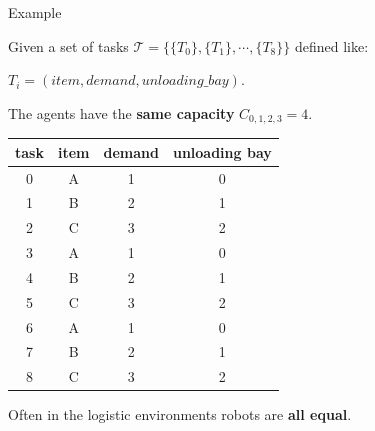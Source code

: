     \begin{frame}[fragile]{Example}
        \begin{center}
        Given a set of tasks $\mathcal{T}= \{  \{T_0\}, \{T_1\}, \cdots, \{T_8\} \}$ defined like:

        ${T_i=(item, demand, unloading\_bay)}$.
        
        The agents have the {\bf same capacity} $C_{0,1,2,3} = 4$.
                    \begin{center}
                      \begin{tabular}{|c|c|c|c|} \hline
                        \textbf{task} & \textbf{item} & \textbf{demand} & \textbf{unloading bay} \\ \hline
                        0    & A    & 1      & 0             \\
                        1    & B    & 2      & 1             \\
                        2    & C    & 3      & 2             \\
                        3    & A    & 1      & 0             \\
                        4    & B    & 2      & 1             \\
                        5    & C    & 3      & 2             \\
                        6    & A    & 1      & 0             \\
                        7    & B    & 2      & 1             \\
                        8    & C    & 3      & 2             \\ \hline       
                      \end{tabular} 
                    \end{center}
                    Often in the logistic environments robots are {\bf all equal}. 
                \end{center}
            
    \end{frame}

